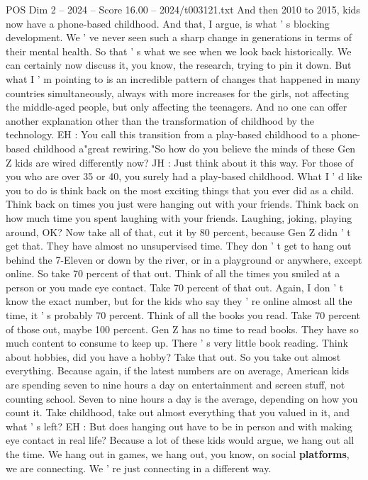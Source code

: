 \begin{textsample}{POS Dim 2 – 2024 – Score 16.00 – 2024/t003121.txt}
And then 2010 to 2015, kids now have a phone-based childhood.
And that, I argue, is what ' s blocking development.
We ' ve never seen such a sharp change in generations in terms of their mental health.
So that ' s what we see when we look back historically.
We can certainly now discuss it, you know, the research, trying to pin it down.
But what I ' m pointing to is an incredible pattern of changes that happened in many countries simultaneously, always with more increases for the girls, not affecting the middle-aged people, but only affecting the teenagers.
And no one can offer another explanation other than the transformation of childhood by the technology.
EH : You call this transition from a play-based childhood to a phone-based childhood a"great rewiring."So how do you believe the minds of these Gen Z kids are wired differently now?
JH : Just think about it this way.
For those of you who are over 35 or 40, you surely had a play-based childhood.
What I ' d like you to do is think back on the most exciting things that you ever did as a child.
Think back on times you just were hanging out with your friends.
Think back on how much time you spent laughing with your friends.
Laughing, joking, playing around, OK?
Now take all of that, cut it by 80 percent, because Gen Z didn ' t get that.
They have almost no unsupervised time.
They don ' t get to hang out behind the 7-Eleven or down by the river, or in a playground or anywhere, except online.
So take 70 percent of that out.
Think of all the times you smiled at a person or you made eye contact.
Take 70 percent of that out.
Again, I don ' t know the exact number, but for the kids who say they ' re online almost all the time, it ' s probably 70 percent.
Think of all the books you read.
Take 70 percent of those out, maybe 100 percent.
Gen Z has no time to read books.
They have so much content to consume to keep up.
There ' s very little book reading.
Think about hobbies, did you have a hobby?
Take that out.
So you take out almost everything.
Because again, if the latest numbers are on average, American kids are spending seven to nine hours a day on entertainment and screen stuff, not counting school.
Seven to nine hours a day is the average, depending on how you count it.
Take childhood, take out almost everything that you valued in it, and what ' s left?
EH : But does hanging out have to be in person and with making eye contact in real life?
Because a lot of these kids would argue, we hang out all the time.
We hang out in games, we hang out, you know, on social \textbf{platforms}, we are connecting.
We ' re just connecting in a different way.

\end{textsample}
